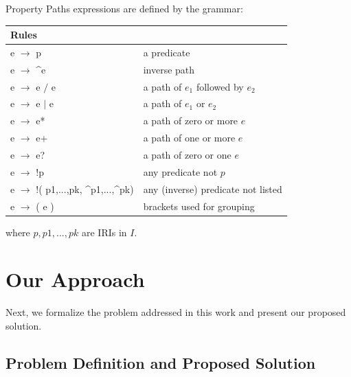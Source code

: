 \documentclass[runningheads]{llncs}
\begin{document}
\begin{definition}
	\label{eq:pp}
	Property Paths expressions are defined by the grammar:\\
	
	\begin{tabular}{ll}    \hline
		Rules &  \\    \hline
		e $\rightarrow$ p & a predicate \\
		
		e $\rightarrow$ \^{}e    &  inverse path \\
		
		e $\rightarrow$ e $/$ e    &  a path of $ e_1 $ followed by $ e_2 $\\
		
		e $\rightarrow$ e $\mid$ e    &  a path of $ e_1 $ or $ e_2 $ \\
		
		e $\rightarrow$ e*    &  a path of zero or more $ e $ \\
		
		e $\rightarrow$ e+    &  a path of one or more $ e $ \\
		
		e $\rightarrow$ e?    &  a path of zero or one $ e $ \\
		
		e $\rightarrow$ !p    &  any predicate not $ p $ \\
		
		e $\rightarrow$ !( p1,...,pk, \^{}p1,...,\^{}pk)    &  any (inverse) predicate not listed \\
		
		e $\rightarrow$ ( e )    &  brackets used for grouping \\    \hline
	\end{tabular}
	
	where $p, p1,...,pk$ are IRIs in $I$.
\end{definition}

\section{Our Approach}
\label{sec:approach}

Next, we formalize the problem addressed in this work and present our proposed solution.

\subsection{Problem Definition and Proposed Solution}
\end{document}
